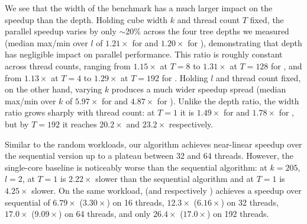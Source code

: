 We see that the width of the benchmark has a much larger impact on the speedup
than the depth. Holding cube width $k$ and thread count $T$ fixed, the parallel
speedup varies by only $\sim$20\% across the four tree depths we measured
(median max/min over $l$ of $1.21\times$ for \filteralgo and $1.20\times$ for
\parentalgo), demonstrating that depth has negligible impact on parallel
performance. This ratio is roughly constant across thread counts, ranging from
$1.15\times$ at $T{=}8$ to $1.31\times$ at $T{=}128$ for \filteralgo, and from
$1.13\times$ at $T{=}4$ to $1.29\times$ at $T{=}192$ for \parentalgo. Holding
$l$ and thread count fixed, on the other hand, varying $k$ produces a much wider
speedup spread (median max/min over $k$ of $5.97\times$ for \filteralgo and
$4.87\times$ for \parentalgo). Unlike the depth ratio, the width ratio grows
sharply with thread count: at $T{=}1$ it is $1.49\times$ for \filteralgo and
$1.78\times$ for \parentalgo, but by $T{=}192$ it reaches $20.2\times$ and
$23.2\times$ respectively.

Similar to the random workloads, our algorithm achieves near-linear speedup over
the sequential version up to a plateau between 32 and 64 threads. However, the
single-core baseline is noticeably worse than the sequential algorithm: at
$k{=}205$, $l{=}2$, \filteralgo at $T{=}1$ is $2.22\times$ slower than the
sequential algorithm and \parentalgo at $T{=}1$ is $4.25\times$ slower. On the
same workload, \filteralgo (and respectively \parentalgo) achieves a speedup
over sequential of $6.79\times$ ($3.30\times$) on 16 threads, $12.3\times$
($6.16\times$) on 32 threads, $17.0\times$ ($9.09\times$) on 64 threads, and
only $26.4\times$ ($17.0\times$) on 192 threads.








